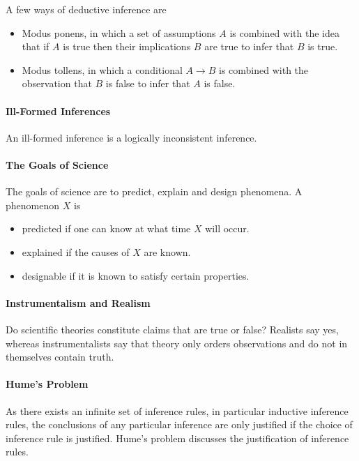 A few ways of deductive inference are
\begin{itemize}
	\item Modus ponens, in which a set of assumptions $A$ is combined with the idea that if $A$ is true then their implications $B$ are true to infer that $B$ is true.
	\item Modus tollens, in which a conditional $A\to B$ is combined with the observation that $B$ is false to infer that $A$ is false. 
\end{itemize}

\paragraph{Ill-Formed Inferences}
An ill-formed inference is a logically inconsistent inference.

\paragraph{The Goals of Science}
The goals of science are to predict, explain and design phenomena. A phenomenon $X$ is
\begin{itemize}
	\item predicted if one can know at what time $X$ will occur.
	\item explained if the causes of $X$ are known.
	\item designable if it is known to satisfy certain properties.
\end{itemize}

\paragraph{Instrumentalism and Realism}
Do scientific theories constitute claims that are true or false? Realists say yes, whereas instrumentalists say that theory only orders observations and do not in themselves contain truth.

\paragraph{Hume's Problem}
As there exists an infinite set of inference rules, in particular inductive inference rules, the conclusions of any particular inference are only justified if the choice of inference rule is justified. Hume's problem discusses the justification of inference rules.

